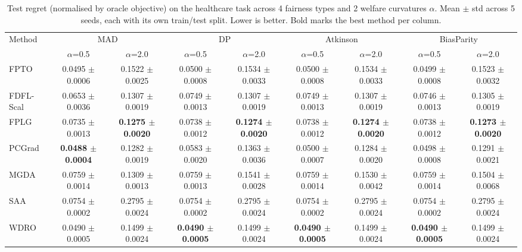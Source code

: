\begin{table}[t]
\centering
\small
\caption{Test regret (normalised by oracle objective) on the healthcare task across 4 fairness types and 2 welfare curvatures $\alpha$. Mean $\pm$ std across 5 seeds, each with its own train/test split. Lower is better. Bold marks the best method per column.}
\label{tab:healthcare_regret}
\begin{tabular}{lcccccccc}
\toprule
Method & \multicolumn{2}{c}{MAD} & \multicolumn{2}{c}{DP} & \multicolumn{2}{c}{Atkinson} & \multicolumn{2}{c}{BiasParity} \\
 & $\alpha$=0.5 & $\alpha$=2.0 & $\alpha$=0.5 & $\alpha$=2.0 & $\alpha$=0.5 & $\alpha$=2.0 & $\alpha$=0.5 & $\alpha$=2.0 \\
\midrule
FPTO & 0.0495 $\pm$ 0.0006 & 0.1522 $\pm$ 0.0025 & 0.0500 $\pm$ 0.0008 & 0.1534 $\pm$ 0.0033 & 0.0500 $\pm$ 0.0008 & 0.1534 $\pm$ 0.0033 & 0.0499 $\pm$ 0.0008 & 0.1523 $\pm$ 0.0032 \\
FDFL-Scal & 0.0653 $\pm$ 0.0036 & 0.1307 $\pm$ 0.0019 & 0.0749 $\pm$ 0.0013 & 0.1307 $\pm$ 0.0019 & 0.0749 $\pm$ 0.0013 & 0.1307 $\pm$ 0.0019 & 0.0746 $\pm$ 0.0013 & 0.1305 $\pm$ 0.0019 \\
FPLG & 0.0735 $\pm$ 0.0013 & \textbf{0.1275 $\pm$ 0.0020} & 0.0738 $\pm$ 0.0012 & \textbf{0.1274 $\pm$ 0.0020} & 0.0738 $\pm$ 0.0012 & \textbf{0.1274 $\pm$ 0.0020} & 0.0738 $\pm$ 0.0012 & \textbf{0.1273 $\pm$ 0.0020} \\
PCGrad & \textbf{0.0488 $\pm$ 0.0004} & 0.1282 $\pm$ 0.0019 & 0.0583 $\pm$ 0.0020 & 0.1363 $\pm$ 0.0036 & 0.0500 $\pm$ 0.0007 & 0.1284 $\pm$ 0.0020 & 0.0498 $\pm$ 0.0008 & 0.1291 $\pm$ 0.0021 \\
MGDA & 0.0759 $\pm$ 0.0014 & 0.1309 $\pm$ 0.0013 & 0.0759 $\pm$ 0.0013 & 0.1541 $\pm$ 0.0028 & 0.0759 $\pm$ 0.0014 & 0.1530 $\pm$ 0.0042 & 0.0759 $\pm$ 0.0014 & 0.1504 $\pm$ 0.0068 \\
SAA & 0.0754 $\pm$ 0.0002 & 0.2795 $\pm$ 0.0024 & 0.0754 $\pm$ 0.0002 & 0.2795 $\pm$ 0.0024 & 0.0754 $\pm$ 0.0002 & 0.2795 $\pm$ 0.0024 & 0.0754 $\pm$ 0.0002 & 0.2795 $\pm$ 0.0024 \\
WDRO & 0.0490 $\pm$ 0.0005 & 0.1499 $\pm$ 0.0024 & \textbf{0.0490 $\pm$ 0.0005} & 0.1499 $\pm$ 0.0024 & \textbf{0.0490 $\pm$ 0.0005} & 0.1499 $\pm$ 0.0024 & \textbf{0.0490 $\pm$ 0.0005} & 0.1499 $\pm$ 0.0024 \\
\bottomrule
\end{tabular}
\end{table}
